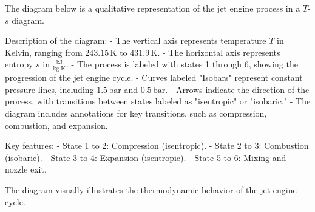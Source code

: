 The diagram below is a qualitative representation of the jet engine process in a \( T \)-\( s \) diagram.  

Description of the diagram:  
- The vertical axis represents temperature \( T \) in Kelvin, ranging from \( 243.15 \, \text{K} \) to \( 431.9 \, \text{K} \).  
- The horizontal axis represents entropy \( s \) in \( \frac{\text{kJ}}{\text{kg·K}} \).  
- The process is labeled with states 1 through 6, showing the progression of the jet engine cycle.  
- Curves labeled "Isobars" represent constant pressure lines, including \( 1.5 \, \text{bar} \) and \( 0.5 \, \text{bar} \).  
- Arrows indicate the direction of the process, with transitions between states labeled as "isentropic" or "isobaric."  
- The diagram includes annotations for key transitions, such as compression, combustion, and expansion.  

Key features:  
- State 1 to 2: Compression (isentropic).  
- State 2 to 3: Combustion (isobaric).  
- State 3 to 4: Expansion (isentropic).  
- State 5 to 6: Mixing and nozzle exit.  

The diagram visually illustrates the thermodynamic behavior of the jet engine cycle.
